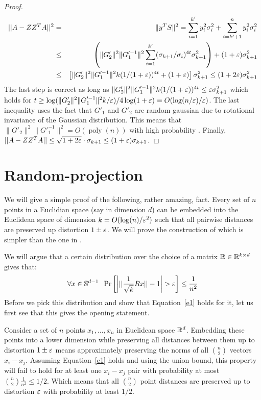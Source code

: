 \documentclass{article}
\begin{document}
\begin{proof}
\begin{eqnarray}
||A - ZZ^TA||^2 &=& \|y^TS\|^2 = \sum_{i=1}^{k'}y^2_i \sigma_i^2 + \sum_{i=k'+1}^{n}y^2_i \sigma_i^2 \\
&\le& \left( \|G'_2\|^2 \|G'^{-1}_1\|^2 \sum_{i=1}^{k'}(\sigma_{k+1}/\sigma_i)^{4t}  \sigma_{k+1}^2 \right) + (1+\varepsilon)\sigma_{k+1}^2 \\
&\le& \left[ \|G'_2\|^2 \|G'^{-1}_1\|^2 k (1/(1+\varepsilon))^{4t} + (1+\varepsilon)\right]\sigma_{k+1}^2 \le (1+2\varepsilon)\sigma_{k+1}^2
\end{eqnarray}
The last step is correct as long as $ \|G'_2\|^2 \|G'^{-1}_1\|^2 k (1/(1+\varepsilon))^{4t} \le \varepsilon \sigma^2_{k+1}$ which holds for $t \ge \log(\|G'_2\|^2 \|G'^{-1}_1\|^2 k/\varepsilon) /4\log(1+\varepsilon) = O(\log(n/\varepsilon)/\varepsilon)$. The last inequality uses the fact that $G'_1$ and $G'_2$ are random gaussian due to rotational invariance of the Gaussian distribution. This means that $\|G'_2\|^2 \|G'^{-1}_1\|^2 = O(\operatorname{poly}(n))$ with high probability \cite{Rudelson08}.
Finally, $||A - ZZ^TA|| \le \sqrt{1+2\varepsilon}\cdot\sigma_{k+1} \le (1+\varepsilon)\sigma_{k+1}$.
\end{proof}




\section{Random-projection}

We will give a simple proof of the following, rather amazing, fact. Every set of $n$ points 
in a Euclidian space (say in dimension $d$) can be embedded into the Euclidean space of 
dimension $k = O(\log(n)/\varepsilon^2)$ such that all pairwise distances are preserved up distortion $1\pm \varepsilon$.
We will prove the construction of \cite{DasGuptaGupta99} which is simpler than the one in \cite{JL84}.


We will argue that a certain distribution over the choice of a matrix ${\mathbb{R}} \in {\mathbb{R}}^{k \times d}$ gives that:
\begin{equation}
\label{e1}
\forall x \in {\mathbb{S}}^{d-1} \;\; \Pr\left[ \left| ||\frac{1}{\sqrt{k}}Rx|| - 1 \right| > \varepsilon \right] \le \frac{1}{n^2} 
\end{equation}
Before we pick this distribution and show that Equation~\ref{e1} holds for it, let us first see
that this gives the opening statement. 

Consider a set of $n$ points $x_1,\ldots, x_n$ in Euclidean space ${\mathbb{R}}^d$. Embedding these points
into a lower dimension while preserving all distances between
them up to distortion $1\pm \varepsilon$ means approximately preserving the norms of all 
${n \choose 2}$ vectors $x_i - x_j$. Assuming Equation~\ref{e1} holds and using the union 
bound, this property will fail to hold for at least one $x_i - x_j$ pair with probability at most ${n \choose 2}\frac{1}{n^2} \le 1/2$.
Which means that all ${n \choose 2}$ point distances are preserved up to distortion $\varepsilon$ with probability at least $1/2$.
\end{document}
